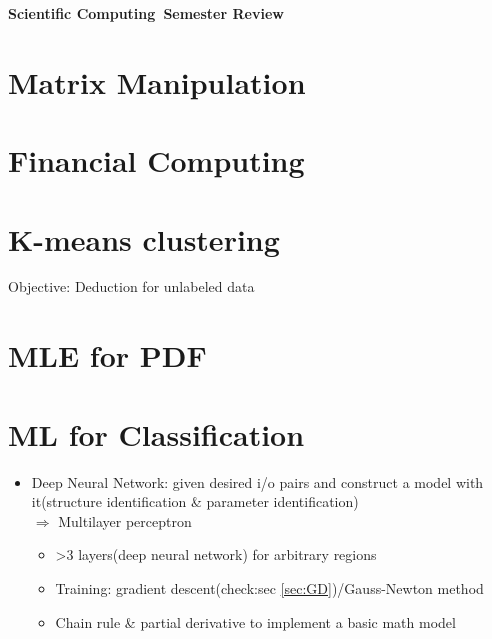 \documentclass[12pt,a4paper,draft]{article}
\newcommand{\classname}{Scientific Computing}
\begin{document}
\begin{center}
\LARGE\textbf{\classname \ Semester Review}
\end{center}
\section{Matrix Manipulation}
\section{Financial Computing}
\section{K-means clustering}
Objective: Deduction for unlabeled data
\section{MLE for PDF}
\section{ML for Classification}
\begin{itemize}
\item Deep Neural Network: given desired i/o pairs and construct a model with it(structure identification \&{} parameter identification)\\
$\Rightarrow$  Multilayer perceptron
\begin{itemize}
\item >3 layers(deep neural network) for arbitrary regions
\item Training: gradient descent(check:sec \ref{sec:GD})/Gauss-Newton method
\item Chain rule \& partial derivative to implement a basic math model
\end{itemize}
\end{itemize}
\end{document}
